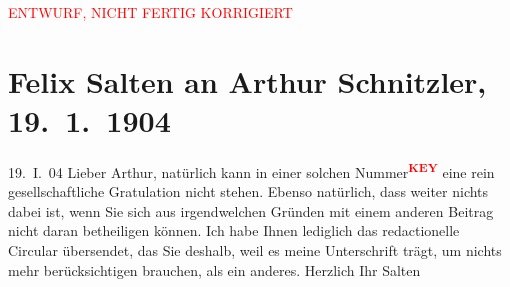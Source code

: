 
\begin{center}
            \textcolor{red}{ENTWURF, NICHT FERTIG KORRIGIERT}
                      \end{center}
            
         \renewcommand{\erwaehnteOrte}{Orte: Wien}
         \renewcommand{\erwaehnteWerke}{}
               \section[Felix Salten an Arthur Schnitzler, 19. 1. 1904]{ Felix Salten an Arthur Schnitzler, 19. 1. 1904}\nopagebreak{}\rehead{ }\begin{ledgroupsized}[t]{13cm}\normalsize\beginnumbering \toendnotes[C]{\smallbreak\pagebreak[2]} 
\toendnotes[C]{\smallbreak}\pstart
           \raggedleft{}{\pb}19. I. 04\pend
           \pstart
           Lieber Arthur, natürlich kann in einer solchen Nummer\textcolor{red}{\textsuperscript{\textbf{KEY}}} eine rein gesellschaftliche Gratulation nicht
               stehen. Ebenso natürlich, dass weiter nichts dabei ist, wenn Sie sich aus
               irgendwelchen Gründen mit einem anderen Beitrag nicht daran betheiligen können. Ich
               habe Ihnen lediglich das redactionelle Circular übersendet, das Sie deshalb, weil es
               meine Unterschrift trägt, um nichts mehr berücksichtigen brauchen, als ein anderes. \pend
           \pstart Herzlich Ihr \spacefill\mbox{Salten}\pend{}
         
         \endnumbering{}\end{ledgroupsized}\begin{anhang}\end{anhang}\newcommand{\dateiname}{L03391}\newcommand{\titel}{Felix Salten an Arthur Schnitzler, 19. 1. 1904}\newcommand{\editorInnen}{Martin Anton Müller und Laura Untner}
      